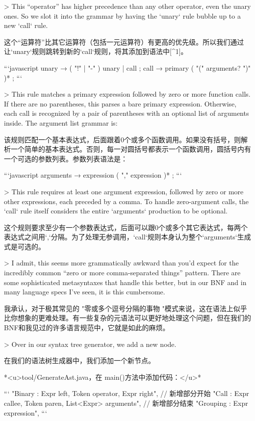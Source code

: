 \documentclass[cn,11pt,chinese]{elegantbook}
\begin{document}
{> This “operator” has higher precedence than any other operator, even the unary ones. So we slot it into the grammar by having the `unary` rule bubble up to a new `call` rule.

这个“运算符”比其它运算符（包括一元运算符）有更高的优先级。所以我们通过让`unary`规则跳转到新的`call`规则，将其添加到语法中[^1]。

```javascript
unary          → ( "!" | "-" ) unary | call ;
call           → primary ( "(" arguments? ")" )* ;
```

> This rule matches a primary expression followed by zero or more function calls. If there are no parentheses, this parses a bare primary expression. Otherwise, each call is recognized by a pair of parentheses with an optional list of arguments inside. The argument list grammar is:

该规则匹配一个基本表达式，后面跟着0个或多个函数调用。如果没有括号，则解析一个简单的基本表达式。否则，每一对圆括号都表示一个函数调用，圆括号内有一个可选的参数列表。参数列表语法是：

```javascript
arguments      → expression ( "," expression )* ;
```

> This rule requires at least one argument expression, followed by zero or more other expressions, each preceded by a comma. To handle zero-argument calls, the `call` rule itself considers the entire `arguments` production to be optional.

这个规则要求至少有一个参数表达式，后面可以跟0个或多个其它表达式，每两个表达式之间用`,`分隔。为了处理无参调用，`call`规则本身认为整个`arguments`生成式是可选的。

> I admit, this seems more grammatically awkward than you’d expect for the incredibly common “zero or more comma-separated things” pattern. There are some sophisticated metasyntaxes that handle this better, but in our BNF and in many language specs I’ve seen, it is this cumbersome.

我承认，对于极其常见的 "零或多个逗号分隔的事物 "模式来说，这在语法上似乎比你想象的更难处理。有一些复杂的元语法可以更好地处理这个问题，但在我们的BNF和我见过的许多语言规范中，它就是如此的麻烦。

> Over in our syntax tree generator, we add a new node.

在我们的语法树生成器中，我们添加一个新节点。

*<u>tool/GenerateAst.java，在 main()方法中添加代码：</u>*

```
      "Binary   : Expr left, Token operator, Expr right",
      // 新增部分开始
      "Call     : Expr callee, Token paren, List<Expr> arguments",
      // 新增部分结束
      "Grouping : Expr expression",
```

}
\end{document}
